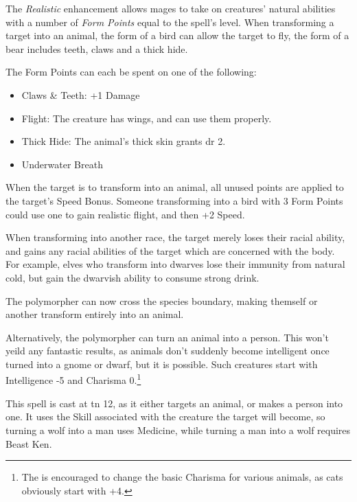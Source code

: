 \documentclass[titlepage,a4paper,openany]{book}
\begin{document}
\begin{multicols}{2}
The \textit{Realistic} enhancement allows mages to take on creatures' natural abilities with a number of \textit{Form Points} equal to the spell's level.  When transforming a target into an animal, the form of a bird can allow the target to fly, the form of a bear includes teeth, claws and a thick hide.

The Form Points can each be spent on one of the following:

\begin{itemize}

	\item{Claws \& Teeth: +1 Damage}
	\item{Flight: The creature has wings, and can use them properly.}
	\item{Thick Hide: The animal's thick skin grants \gls{dr} 2.}
	\item{Underwater Breath}

\end{itemize}

When the target is to transform into an animal, all unused points are applied to the target's Speed Bonus.  Someone transforming into a bird with 3 Form Points could use one to gain realistic flight, and then +2 Speed.

When transforming into another race, the target merely loses their racial ability, and gains any racial abilities of the target which are concerned with the body.  For example, elves who transform into dwarves lose their immunity from natural cold, but gain the dwarvish ability to consume strong drink.


The polymorpher can now cross the species boundary, making themself or another transform entirely into an animal.

Alternatively, the polymorpher can turn an animal into a person.  This won't yeild any fantastic results, as animals don't suddenly become intelligent once turned into a gnome or dwarf, but it is possible.  Such creatures start with Intelligence -5 and Charisma 0.\footnote{The  is encouraged to change the basic Charisma for various animals, as cats obviously start with +4.}

This spell is cast at \gls{tn} 12, as it either targets an animal, or makes a person into one.  It uses the Skill associated with the creature the target will become, so turning a wolf into a man uses Medicine, while turning a man into a wolf requires Beast Ken.


\end{multicols}
\end{document}
